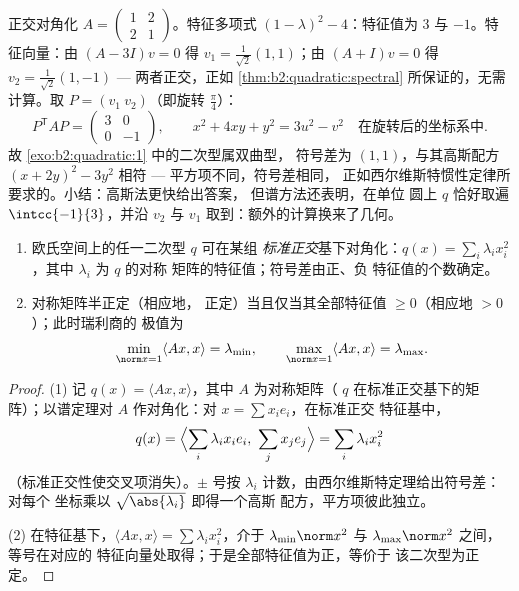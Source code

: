 \begin{example}[完整的谱计算]\label{ex:b2:quadratic:fullrun}
正交对角化 $A = \begin{pmatrix} 1 & 2\\ 2 &
1\end{pmatrix}$。特征多项式 $(1 - \lambda)^2 -
4$：特征值为 $3$ 与 $-1$。特征向量：由 $(A - 3I)v = 0$
得 $v_1 = \frac{1}{\sqrt2}(1,1)$；由 $(A + I)v = 0$ 得 $v_2
= \frac{1}{\sqrt2}(1,-1)$ --- 两者正交，正如
\cref{thm:b2:quadratic:spectral} 所保证的，无需
计算。取 $P = (v_1\ v_2)$（即旋转
$\frac\pi4$）：
\[
P^{\mathsf T}AP = \begin{pmatrix} 3 & 0\\ 0 & -1
\end{pmatrix},
\qquad
x^2 + 4xy + y^2 = 3u^2 - v^2
\quad\text{在旋转后的坐标系中} .
\]
故 \cref{exo:b2:quadratic:1} 中的二次型属双曲型，
符号差为 $(1,1)$，与其高斯配方
$(x + 2y)^2 - 3y^2$ 相符 --- 平方项不同，符号差相同，
正如西尔维斯特惯性定律所要求的。小结：高斯法更快给出答案，
但谱方法还表明，在单位
圆上 $q$ 恰好取遍 $\intcc{-1}{3}$，并沿
$v_2$ 与 $v_1$ 取到：额外的计算换来了几何。
\end{example}

\begin{corollary}[主轴；正定性判别]\label{cor:b2:quadratic:principalaxes}
\begin{enumerate}
  \item 欧氏空间上的任一二次型 $q$ 可在某组
        \emph{标准正交}基下对角化：$q(x) = \sum_i \lambda_i
        x_i^2$，其中 $\lambda_i$ 为 $q$ 的对称
        矩阵的特征值；符号差由正、负
        特征值的个数确定。
  \item 对称矩阵半正定（相应地，
        正定）当且仅当其全部特征值 $\geq 0$（相应地 $>
        0$）；此时瑞利商的
        极值为
        \[
        \min_{\norm x = 1} \langle Ax, x\rangle = \lambda_{\min},
        \qquad
        \max_{\norm x = 1} \langle Ax, x\rangle = \lambda_{\max} .
        \]
\end{enumerate}
\end{corollary}

\begin{proof}
(1) 记 $q(x) = \langle A x, x\rangle$，其中 $A$ 为对称矩阵（
$q$ 在标准正交基下的矩阵）；以谱定理对 $A$
作对角化：对 $x = \sum x_ie_i$，在标准正交
特征基中，
\[
q(x) = \Bigl\langle \sum_i \lambda_ix_ie_i,\ \sum_j
x_je_j\Bigr\rangle = \sum_i \lambda_i x_i^2
\]
（标准正交性使交叉项消失）。$\pm$ 号按
$\lambda_i$ 计数，由西尔维斯特定理给出符号差：对每个
坐标乘以 $\sqrt{\abs{\lambda_i}}$ 即得一个高斯
配方，平方项彼此独立。

(2) 在特征基下，$\langle Ax, x\rangle = \sum \lambda_i
x_i^2$，介于 $\lambda_{\min}\norm x^2$ 与
$\lambda_{\max}\norm x^2$ 之间，等号在对应的
特征向量处取得；于是全部特征值为正，等价于
该二次型为正定。
\end{proof}

